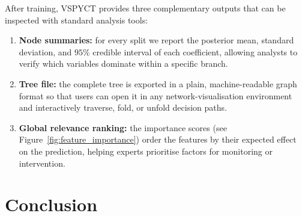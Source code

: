 \documentclass[3p,review,authoryear]{elsarticle}
\begin{document}
After training, VSPYCT provides three complementary outputs that can be inspected with standard analysis tools:
\begin{enumerate}
  \item \textbf{Node summaries:} for every split we report the posterior mean, standard deviation, and $95\%$ credible interval of each coefficient, allowing analysts to verify which variables dominate within a specific branch.
  \item \textbf{Tree file:} the complete tree is exported in a plain, machine-readable graph format so that users can open it in any network-visualisation environment and interactively traverse, fold, or unfold decision paths.
  \item \textbf{Global relevance ranking:} the importance scores (see Figure~\ref{fig:feature_importance}) order the features by their expected effect on the prediction, helping experts prioritise factors for monitoring or intervention.
\end{enumerate}



\section{Conclusion}

\end{document}
